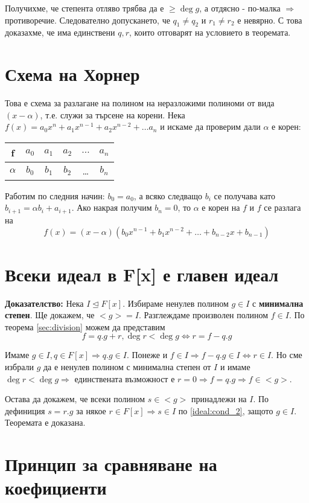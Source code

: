\documentclass[fleqn,12pt]{article}
\begin{document}
Получихме, че степента отляво трябва да е $\geq \deg g$, а отдясно - по-малка
$\Rightarrow$ противоречие. Следователно допускането, че $q_1 \neq q_2$ и $r_1 \neq r_2$ е невярно.
С това доказахме, че има единствени $q,r$, които отговарят на условието в теоремата.


\section{Схема на Хорнер}
Това е схема за разлагане на полином на неразложими полиноми от вида $(x - \alpha)$, т.е. служи за търсене на корени.
Нека $f(x) = a_0 x^n + a_1 x^{n-1} + a_2 x^{n-2} + \dots a_n$ и искаме да проверим дали $\alpha$ е корен:

\begin{tabular}{ |c|c|c|c|c|c| } 
    \hline
    f        & $a_0$ & $a_1$ & $a_2$ & $\dots$ & $a_n$ \\ 
    \hline
    $\alpha$ & $b_0$ & $b_1$ & $b_2$ & \dots & $b_n$  \\ 
    \hline
\end{tabular}

Работим по следния начин: $b_0 = a_0$, а всяко следващо $b_i$ се получава като $b_{i+1} = \alpha b_i + a_{i+1}$.
Ако накрая получим $b_n = 0$, то $\alpha$ е корен на $f$ и $f$ се разлага на 
\[ f(x) = (x - \alpha)(b_0 x^{n-1} + b_1 x^{n-2} + \dots + b_{n-2} x + b_{n-1}) \]

\section{Всеки идеал в F[x] е главен идеал}
\textbf{Доказателство: } Нека $I \trianglelefteq F[x]$. Избираме ненулев полином $g \in I$ с \textbf{минимална степен}.
Ще докажем, че $<g> = I$.
Разглеждаме произволен полином $f \in I$. По теорема \ref{sec:division} можем да представим 
\[ f = q.g + r, \deg r < \deg g \Leftrightarrow r = f - q.g \]

Имаме $g \in I, q \in F[x] \Rightarrow q.g \in I$. Понеже и $f \in I \Rightarrow f - q.g \in I \Leftrightarrow r \in I$.
Но сме избрали $g$ да е ненулев полином с минимална степен от $I$ и имаме $\deg r < \deg g \Rightarrow$ единствената възможност
е $r = 0 \Rightarrow f = q.g \Rightarrow f \in <g>$.

Остава да докажем, че всеки полином $s \in <g>$ принадлежи на $I$. 
По дефиниция $s = r.g$ за някое $r \in F[x] \Rightarrow s \in I$ по \ref{ideal:cond_2}, защото $g \in I$.
Теоремата е доказана.

\section{Принцип за сравняване на коефициенти}
\end{document}
